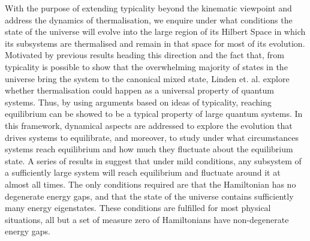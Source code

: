  
\indent With the purpose of extending typicality beyond the kinematic viewpoint and address the dynamics of thermalisation, we enquire under what conditions the state of the universe will evolve into the large region of its Hilbert Space in which its subsystems are thermalised and remain in that space for most of its evolution. Motivated by previous results heading this direction\cite{tasaki_quantum_1998,gemmer_thermalization_2006} and the fact that, from typicality is possible to show that the overwhelming majority of states in the universe bring the system to the canonical mixed state, Linden et. al.\cite{linden_quantum_2009} explore whether thermalisation could happen as a universal property of quantum systems. Thus, by using arguments based on ideas of typicality, reaching equilibrium can be showed to be a typical property of large quantum systems. In this framework, dynamical aspects are addressed to explore the evolution that drives systems to equilibrate, and moreover, to study under what circumstances systems reach equilibrium and how much they fluctuate about the equilibrium state. A series of results in \cite{linden_quantum_2009, linden_speed_2010, malabarba_quantum_2014} suggest that under mild conditions, any subsystem of a sufficiently large system will reach equilibrium and fluctuate around it at almost all times. The only conditions required are that the Hamiltonian has no degenerate energy gaps, and that the state of the universe contains sufficiently many energy eigenstates. These conditions are fulfilled for most physical situations, all but a set of measure zero of Hamiltonians have non-degenerate energy gaps.\\



